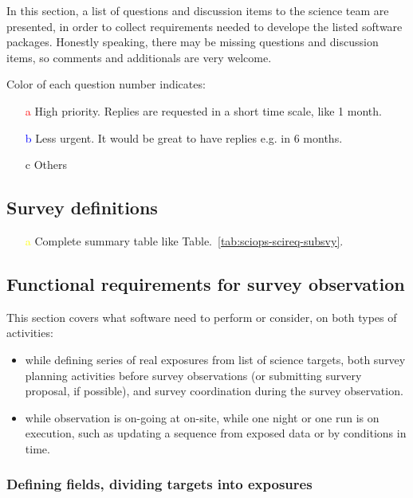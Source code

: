 \documentclass[a4paper,notitlepage]{article}
\newcommand{\cols}[1]{\textcolor{red}{#1}}
\newcommand{\colm}[1]{\textcolor{yellow}{#1}}
\newcommand{\coll}[1]{\textcolor{blue}{#1}}
\begin{document}
In this section, a list of questions and discussion items to the science
team are presented, in order to collect requirements needed to develope
the listed software packages. Honestly speaking, there may be missing
questions and discussion items, so comments and additionals are very
welcome.

Color of each question number indicates: 
\begin{enumerate}
  \item[\cols{a}] High priority. Replies are requested in a short time
	       scale, like 1 month.
  \item[\coll{b}] Less urgent. It would be great to have replies e.g. in
	       6 months.
  \item[c] Others
\end{enumerate}

\subsection{Survey definitions}

\begin{enumerate}
  \item[\colm{a}] Complete summary table like Table.~\ref{tab:sciops-scireq-subsvy}.
\end{enumerate}

\subsection{Functional requirements for survey observation}

This section covers what software need to perform or consider, on both
types of activities:
\begin{itemize}
  \item while defining series of real exposures from list of science targets, 
    both survey planning activities before survey observations (or submitting 
    survery proposal, if possible), and survey coordination during the survey 
    observation. 
  \item while observation is on-going at on-site, while one night or one run 
    is on execution, such as updating a sequence from exposed data or by 
    conditions in time. 
\end{itemize}

\subsubsection{Defining fields, dividing targets into exposures}
\end{document}
